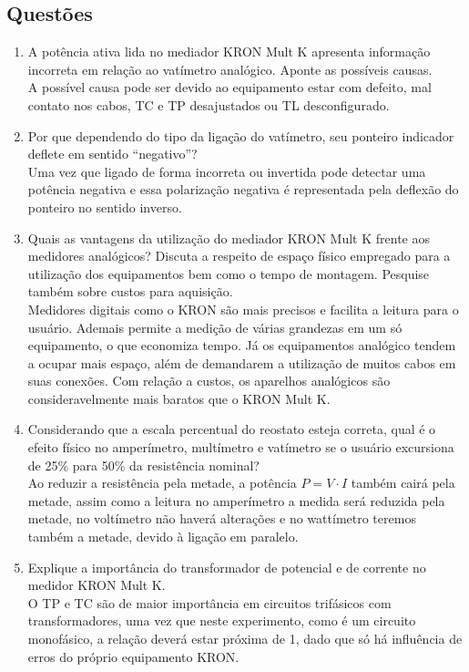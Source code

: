\documentclass[a4paper,12pt,oneside,openany,table,xcdraw]{article}
\begin{document}
\subsection{Questões}
\begin{enumerate}[1)]
\item A potência ativa lida no mediador KRON Mult K apresenta informação incorreta em relação ao vatímetro
analógico. Aponte as possíveis causas.\\
A possível causa pode ser devido ao
equipamento estar com defeito, mal contato nos cabos, TC e TP desajustados ou TL desconfigurado.

\item Por que dependendo do tipo da ligação do vatímetro, seu ponteiro indicador deflete em sentido “negativo”?\\
Uma vez que ligado de forma incorreta ou invertida pode detectar uma potência negativa e essa polarização negativa é representada pela deflexão do
ponteiro no sentido inverso.

\item Quais as vantagens da utilização do mediador KRON Mult K frente aos medidores analógicos? Discuta a
respeito de espaço físico empregado para a utilização dos equipamentos bem como o tempo de montagem.
Pesquise também sobre custos para aquisição.\\
Medidores digitais como o KRON são mais precisos e facilita a leitura para o usuário. Ademais permite a medição de várias grandezas em um só equipamento, o que economiza tempo. Já os equipamentos analógico tendem
a ocupar mais espaço, além de demandarem a utilização de muitos cabos em suas conexões. Com relação a custos, os aparelhos analógicos são consideravelmente
mais baratos que o KRON Mult K.

\item Considerando que a escala percentual do reostato esteja correta, qual é o efeito físico no amperímetro,
multímetro e vatímetro se o usuário excursiona de 25\% para 50\% da resistência nominal?\\

Ao reduzir a resistência pela metade, a potência $P=V\cdot I$ também cairá pela metade, assim como a leitura no amperímetro a medida será reduzida pela metade,
no voltímetro não haverá alterações e no wattímetro teremos também a metade, devido à ligação em paralelo.

\item Explique a importância do transformador de potencial e de corrente no medidor KRON Mult K.\\
O TP e TC são de maior importância em circuitos trifásicos com transformadores, uma vez que neste experimento, como é um circuito monofásico, a relação deverá estar próxima de 1, dado que só há influência de erros do próprio equipamento KRON.


\end{enumerate}
\end{document}
